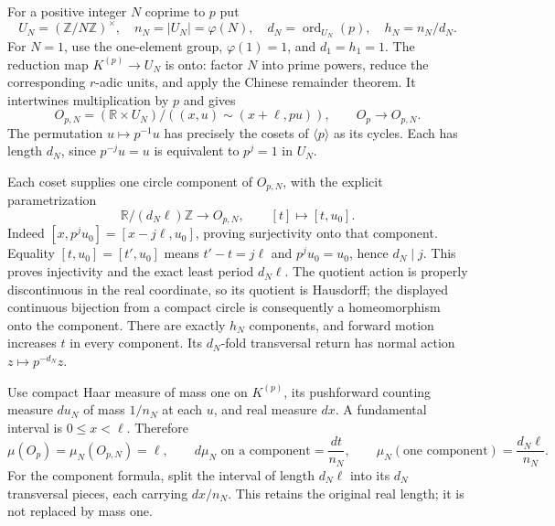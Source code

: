 For a positive integer $N$ coprime to $p$ put
\begin{equation}\tag{PHS3}
 U_N=(\mathbb Z/N\mathbb Z)^\times,\quad n_N=|U_N|=\varphi(N),
 \quad d_N=\operatorname{ord}_{U_N}(p),\quad h_N=n_N/d_N.
\end{equation}
For $N=1$, use the one-element group, $\varphi(1)=1$, and
$d_1=h_1=1$. The reduction map $K^{(p)}\to U_N$ is onto:
factor $N$ into prime powers, reduce the corresponding $r$-adic
units, and apply the Chinese remainder theorem. It intertwines
multiplication by $p$ and gives
\begin{equation}\tag{PHS4}
 O_{p,N}=(\mathbb R\times U_N)/
       ((x,u)\sim(x+\ell,pu)),
 \qquad O_p\longrightarrow O_{p,N}.
\end{equation}
The permutation $u\mapsto p^{-1}u$ has precisely the cosets of
$\langle p\rangle$ as its cycles. Each has length $d_N$, since
$p^{-j}u=u$ is equivalent to $p^j=1$ in $U_N$.

Each coset supplies one circle component of $O_{p,N}$, with
the explicit parametrization
\begin{equation}\tag{PHS5}
 \mathbb R/(d_N\ell)\mathbb Z\longrightarrow O_{p,N},
 \qquad [t]\longmapsto[t,u_0].
\end{equation}
Indeed $[x,p^ju_0]=[x-j\ell,u_0]$, proving surjectivity onto
that component. Equality $[t,u_0]=[t',u_0]$ means
$t'-t=j\ell$ and $p^ju_0=u_0$, hence $d_N\mid j$.
This proves injectivity and the exact least period $d_N\ell$.
The quotient action is properly discontinuous in the real coordinate,
so its quotient is Hausdorff; the displayed continuous bijection from
a compact circle is consequently a homeomorphism onto the component.
There are exactly $h_N$ components, and forward motion increases
$t$ in every component. Its $d_N$-fold transversal return has
normal action $z\mapsto p^{-d_N}z$.

Use compact Haar measure of mass one on $K^{(p)}$, its pushforward
counting measure $du_N$ of mass $1/n_N$ at each $u$, and real
measure $dx$. A fundamental interval is $0\le x<\ell$. Therefore
\begin{equation}\tag{PHS6}
 \mu(O_p)=\mu_N(O_{p,N})=\ell,
 \qquad d\mu_N\text{ on a component}=\frac{dt}{n_N},
 \qquad\mu_N(\text{one component})=\frac{d_N\ell}{n_N}.
\end{equation}
For the component formula, split the interval of length $d_N\ell$
into its $d_N$ transversal pieces, each carrying $dx/n_N$.
This retains the original real length; it is not replaced by mass one.


